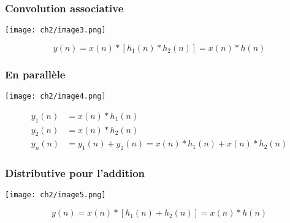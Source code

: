 		\subsubsection{Convolution associative}
		\begin{center}
		\texttt{[image: ch2/image3.png]}
		\end{center}
		\begin{equation}
		y(n) = x(n)*[h_1(n)*h_2(n)] = x(n)*h(n)
		\end{equation}
	
		\subsubsection{En parallèle}
		\begin{center}
		\texttt{[image: ch2/image4.png]}
		\end{center}
		\begin{equation}
		\begin{array}{ll}
		y_1(n) &= x(n)*h_1(n)\\
		y_2(n) &= x(n)*h_2(n)\\
		y_n(n) &= y_1(n)+y_2(n) = x(n)*h_1(n)+x(n)*h_2(n)
		\end{array}
		\end{equation}
		
		\subsubsection{Distributive pour l'addition}
		\begin{center}
		\texttt{[image: ch2/image5.png]}
		\end{center}		
		\begin{equation}
		y(n) = x(n)*[h_1(n)+h_2(n)] = x(n)*h(n)
		\end{equation}
		

